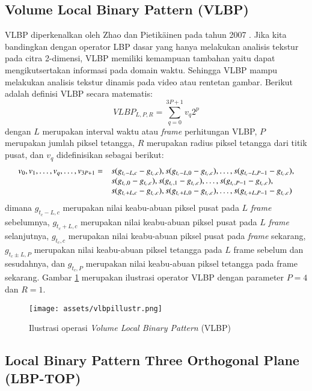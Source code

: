 \documentclass[review,3p,12pt]{elsarticle}
\begin{document}
\subsection{Volume Local Binary Pattern (VLBP)}
\label{vlbp}

VLBP diperkenalkan oleh Zhao dan Pietik\"{a}inen pada tahun 2007 \cite{zhao2007dynamic}. Jika kita bandingkan dengan operator LBP dasar yang hanya melakukan analisis tekstur pada citra 2-dimensi, VLBP memiliki kemampuan tambahan yaitu dapat mengikutsertakan informasi pada domain waktu. Sehingga VLBP mampu melakukan analisis tekstur dinamis pada video atau rentetan gambar. Berikut adalah definisi VLBP secara matematis:
\begin{equation}
VLBP_{L,P,R} = \sum_{q=0}^{3P+1} v_q 2^p
\end{equation}
dengan $L$ merupakan interval waktu atau \textit{frame} perhitungan VLBP, $P$ merupakan jumlah piksel tetangga, $R$ merupakan radius piksel tetangga dari titik pusat, dan $v_q$ didefinisikan sebagai berikut:
\begin{equation}
\begin{array}{l l}
v_0, v_1, \dots, v_q, \dots, v_{3P+1} = & s(g_{t_c-L,c} - g_{t_c,c}), s(g_{t_c-L,0} - g_{t_c,c}), \dots, s(g_{t_c-L,P-1} - g_{t_c,c}),\\
& s(g_{t_c,0} - g_{t_c,c}), s(g_{t_c,1} - g_{t_c,c}), \dots, s(g_{t_c,P-1} - g_{t_c,c}),\\
& s(g_{t_c+L,c} - g_{t_c,c}), s(g_{t_c+L,0} - g_{t_c,c}), \dots, s(g_{t_c+L,P-1} - g_{t_c,c})
\end{array}
\end{equation}
dimana $g_{t_c-L,c}$ merupakan nilai keabu-abuan piksel pusat pada $L$ \textit{frame} sebelumnya, $g_{t_c+L,c}$ merupakan nilai keabu-abuan piksel pusat pada $L$ \textit{frame} selanjutnya, $g_{t_c,c}$ merupakan nilai keabu-abuan piksel pusat pada \textit{frame} sekarang, $g_{t_c \pm L,P}$ merupakan nilai keabu-abuan piksel tetangga pada $L$ frame sebelum dan sesudahnya, dan $g_{t_c,P}$ merupakan nilai keabu-abuan piksel tetangga pada frame sekarang. Gambar \ref{fig:vlbpillustr} merupakan ilustrasi operator VLBP dengan parameter $P = 4$ dan $R = 1$.
\begin{figure}[hbt!]
\caption{Ilustrasi operasi \textit{Volume Local Binary Pattern} (VLBP)}
\label{fig:vlbpillustr}
\centering
	\texttt{[image: assets/vlbpillustr.png]}
\end{figure}

\subsection{Local Binary Pattern Three Orthogonal Plane (LBP-TOP)}
\label{lbptop}
\end{document}
